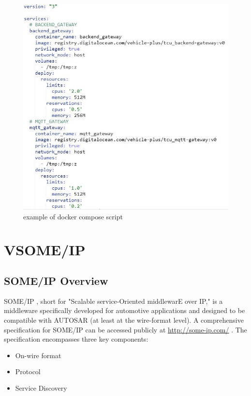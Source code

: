 \documentclass[
12pt,
oneside, 
onehalfspacing, 
nolistspacing, 
parskip, 
chapterinoneline, 
]{AASTCOMPUTER}
\begin{document}
\clearpage

\begin{figure}[h]
\centering
\includegraphics[scale=0.6]{Figures/docker_compose_script.JPG}
\caption[docker compose script]{example of docker compose script}
\label{fig:docker_compose_script}
\end{figure}

\section{VSOME/IP}
\subsection{SOME/IP Overview}
SOME/IP \cite{ioana2020opc}, short for "Scalable service-Oriented middlewarE over IP," is a middleware specifically developed for automotive applications and designed to be compatible with AUTOSAR (at least at the wire-format level). A comprehensive specification for SOME/IP can be accessed publicly at \url{http://some-ip.com/} \cite{SOME/IP}. The specification encompasses three key components:
\begin{itemize}
\item On-wire format
\item Protocol
\item Service Discovery
\end{itemize}
\end{document}
